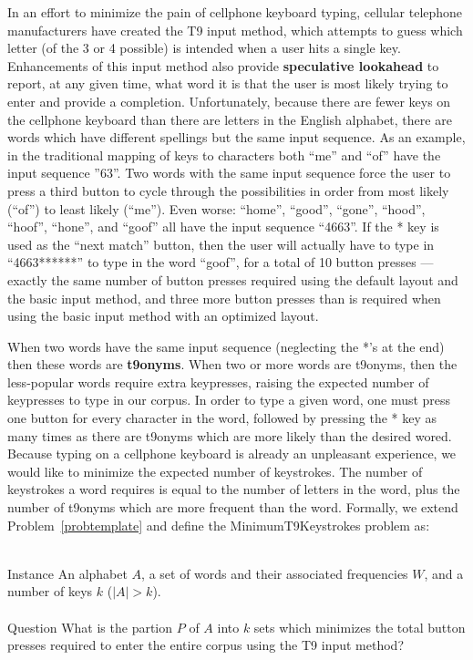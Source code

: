 \documentclass[runningheads]{llncs}
\newcommand{\newword}[1]{{\bf #1}}
\begin{document}
In an effort to minimize the pain of cellphone keyboard typing, cellular
telephone manufacturers have created the T9 input method, which attempts to
guess which letter (of the 3 or 4 possible) is intended when a user hits a
single key.  Enhancements of this input method also provide \newword{speculative
lookahead} to report, at any given time, what word it is that the user is most
likely trying to enter and provide a completion.  Unfortunately, because there
are fewer keys on the cellphone keyboard than there are letters in the English alphabet, there are words
which have different spellings but the same input sequence.  As an example, in
the traditional mapping of keys to characters
both ``me'' and ``of'' have the input sequence ''63''.  Two words with the same
input sequence force the user to press a third button to cycle through the
possibilities in order from most likely (``of'') to least likely (``me'').
Even worse: ``home'', ``good'', ``gone'', ``hood'', ``hoof'', ``hone'', and
``goof'' all have the input sequence ``4663''.  If the * key is used as the
``next match'' button, then the user will actually have to type in
``4663******'' to type in the word ``goof'', for a total of 10 button presses --- exactly the same number of button presses required using the default layout and the basic input method, and three more button presses than is required when using the basic input method with an optimized layout.

When two words have the same input sequence (neglecting the *'s at the end) then these words are \newword{t9onyms}.  When two or more words are t9onyms, then the less-popular words require extra keypresses, raising the expected number of keypresses to type in our corpus.  In order to type a given word, one must press one button for every character in the word, followed by pressing the * key as many times as there are t9onyms which are more likely than the desired wored.  Because typing on a cellphone keyboard is already an unpleasant experience, we would like to minimize the expected number of keystrokes.  The number of keystrokes a word requires is equal to the number of letters in the word, plus the number of t9onyms which are more frequent than the word.  Formally, we extend Problem~\ref{probtemplate} and define the {\sc MinimumT9Keystrokes} problem as:

\begin{prob}~\\
\label{thm:minstrokes}
{\sc Instance} An alphabet $A$, a set of words and their associated frequencies $W$, and a number of keys $k$ ($|A| > k$).\\
~\\
{\sc Question} What is the partion $P$ of $A$ into $k$ sets which minimizes the total button presses required to enter the entire corpus using the T9 input method?
\end{prob}
\end{document}
